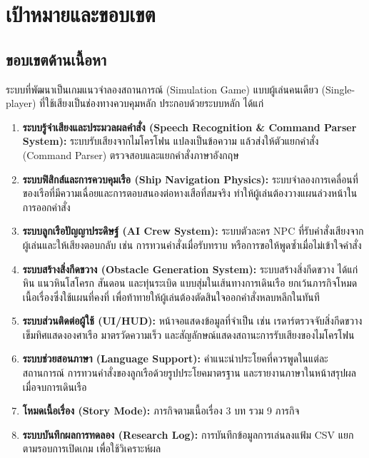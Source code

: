 \section{เป้าหมายและขอบเขต}

\subsection{ขอบเขตด้านเนื้อหา}

ระบบที่พัฒนาเป็นเกมแนวจำลองสถานการณ์ (Simulation Game) แบบผู้เล่นคนเดียว (Single-player) ที่ใช้เสียงเป็นช่องทางควบคุมหลัก ประกอบด้วยระบบหลัก ได้แก่

\begin{enumerate}[label=\arabic*)]
    \item \textbf{ระบบรู้จำเสียงและประมวลผลคำสั่ง (Speech Recognition \& Command Parser System):} ระบบรับเสียงจากไมโครโฟน แปลงเป็นข้อความ แล้วส่งให้ตัวแยกคำสั่ง (Command Parser) ตรวจสอบและแยกคำสั่งภาษาอังกฤษ
    \item \textbf{ระบบฟิสิกส์และการควบคุมเรือ (Ship Navigation Physics):} ระบบจำลองการเคลื่อนที่ของเรือที่มีความเฉื่อยและการตอบสนองต่อหางเสือที่สมจริง ทำให้ผู้เล่นต้องวางแผนล่วงหน้าในการออกคำสั่ง
    \item \textbf{ระบบลูกเรือปัญญาประดิษฐ์ (AI Crew System):} ระบบตัวละคร NPC ที่รับคำสั่งเสียงจากผู้เล่นและให้เสียงตอบกลับ เช่น การทวนคำสั่งเมื่อรับทราบ หรือการขอให้พูดซ้ำเมื่อไม่เข้าใจคำสั่ง
    \item \textbf{ระบบสร้างสิ่งกีดขวาง (Obstacle Generation System):} ระบบสร้างสิ่งกีดขวาง ได้แก่ หิน แนวหินโสโครก สันดอน และทุ่นระเบิด แบบสุ่มในเส้นทางการเดินเรือ ยกเว้นภารกิจโหมดเนื้อเรื่องซึ่งใช้แผนที่คงที่ เพื่อท้าทายให้ผู้เล่นต้องตัดสินใจออกคำสั่งหลบหลีกในทันที
    \item \textbf{ระบบส่วนติดต่อผู้ใช้ (UI/HUD):} หน้าจอแสดงข้อมูลที่จำเป็น เช่น เรดาร์ตรวจจับสิ่งกีดขวาง เข็มทิศแสดงองศาเรือ มาตรวัดความเร็ว และสัญลักษณ์แสดงสถานะการรับเสียงของไมโครโฟน
    \item \textbf{ระบบช่วยสอนภาษา (Language Support):} คำแนะนำประโยคที่ควรพูดในแต่ละสถานการณ์ การทวนคำสั่งของลูกเรือด้วยรูปประโยคมาตรฐาน และรายงานภาษาในหน้าสรุปผลเมื่อจบการเดินเรือ
    \item \textbf{โหมดเนื้อเรื่อง (Story Mode):} ภารกิจตามเนื้อเรื่อง 3 บท รวม 9 ภารกิจ
    \item \textbf{ระบบบันทึกผลการทดลอง (Research Log):} การบันทึกข้อมูลการเล่นลงแฟ้ม CSV แยกตามรอบการเปิดเกม เพื่อใช้วิเคราะห์ผล
\end{enumerate}

